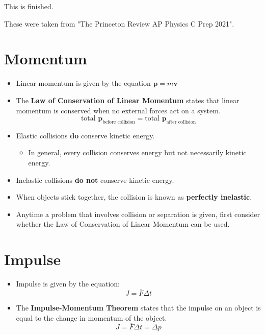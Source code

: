 \documentclass{article}
\begin{document}
\begin{finished}
    This is finished.
\end{finished}

\begin{note}
    These were taken from "The Princeton Review AP Physics C Prep 2021". 
\end{note}

\section{Momentum}
\begin{itemize}
    \item Linear momentum is given by the equation $\textbf{p} = m\textbf{v}$
    \item The \textbf{Law of Conservation of Linear Momentum} states that linear momentum is conserved when no external forces act on a system.
    \begin{equation*}
        \text{total   } \textbf{p}_{\text{before collision}} = \text{total   } \textbf{p}_{\text{after collision}}
    \end{equation*}
    \item Elastic collisions \textbf{do} conserve kinetic energy.
        \begin{itemize}
            \item In general, every collision conserves energy but not necessarily kinetic energy.
        \end{itemize}
    \item Inelastic collisions \textbf{do not} conserve kinetic energy.
    \item When objects stick together, the collision is known as \textbf{perfectly inelastic}.
    \item Anytime a problem that involves collision or separation is given, first consider whether the Law of Conservation of Linear Momentum can be used.
\end{itemize}

\section{Impulse}
\begin{itemize}
    \item Impulse is given by the equation:
    \begin{equation*}
        J=\overline{F}\Delta t
    \end{equation*}
    \item The \textbf{Impulse-Momentum Theorem} states that the impulse on an object is equal to the change in momentum of the object.
    \begin{equation*}
        J=\overline{F}\Delta t = \Delta p
    \end{equation*}
\end{itemize}
\end{document}
